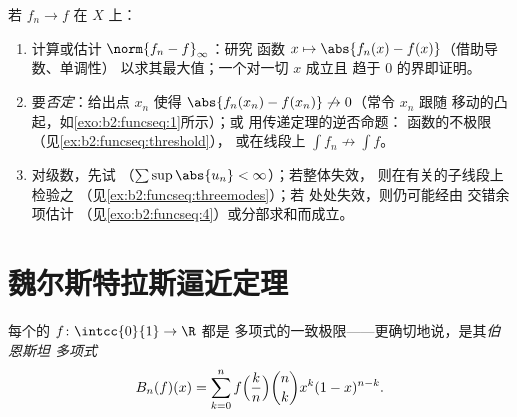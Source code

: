 \begin{method}[证明或否定一致收敛]\label{met:b2:funcseq:uniform}
若 $f_n \to f$ 在 $X$ 上：
\begin{enumerate}
  \item 计算或估计 $\norm{f_n - f}_\infty$：研究
        函数 $x \mapsto \abs{f_n(x) - f(x)}$（借助导数、单调性）
        以求其最大值；一个对一切 $x$ 成立且
        趋于 $0$ 的界即证明。
  \item 要\emph{否定}：给出点 $x_n$ 使得
        $\abs{f_n(x_n) - f(x_n)} \not\to 0$（常令 $x_n$ 跟随
        移动的凸起，如\cref{exo:b2:funcseq:1}所示）；或
        用传递定理的逆否命题：
        函数的不极限（见\cref{ex:b2:funcseq:threshold}），
        或在线段上 $\int f_n
        \not\to \int f$。
  \item 对级数，先试
        （$\sum\sup\abs{u_n} < \infty$）；若整体失效，
        则在有关的子线段上检验之
        （见\cref{ex:b2:funcseq:threemodes}）；若
        处处失效，则仍可能经由
        交错余项估计
        （见\cref{exo:b2:funcseq:4}）或分部求和而成立。
\end{enumerate}
\end{method}

\section{魏尔斯特拉斯逼近定理}

\begin{theorem}\label{thm:b2:funcseq:weierstrass}
每个的 $f \colon \intcc{0}{1} \to \R$ 都是
多项式的一致极限——更确切地说，是其\emph{伯恩斯坦
多项式}
\[
B_n(f)(x) = \sum_{k=0}^{n} f\Bigl(\frac kn\Bigr)\binom nk x^k
(1-x)^{n-k} .
\]
\end{theorem}

